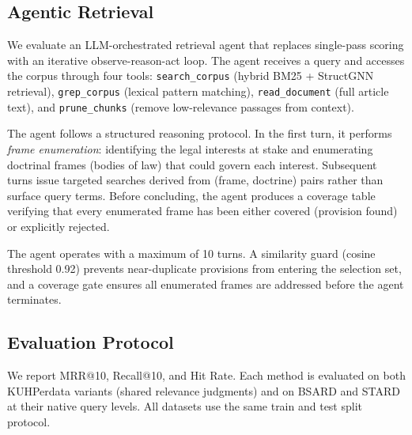 \subsection{Agentic Retrieval}
\label{sec:agentic}

We evaluate an LLM-orchestrated retrieval agent that replaces single-pass scoring with an iterative observe-reason-act loop. The agent receives a query and accesses the corpus through four tools: \texttt{search\_corpus} (hybrid BM25 + StructGNN retrieval), \texttt{grep\_corpus} (lexical pattern matching), \texttt{read\_document} (full article text), and \texttt{prune\_chunks} (remove low-relevance passages from context).

The agent follows a structured reasoning protocol. In the first turn, it performs \emph{frame enumeration}: identifying the legal interests at stake and enumerating doctrinal frames (bodies of law) that could govern each interest. Subsequent turns issue targeted searches derived from (frame, doctrine) pairs rather than surface query terms. Before concluding, the agent produces a coverage table verifying that every enumerated frame has been either covered (provision found) or explicitly rejected.

The agent operates with a maximum of 10 turns. A similarity guard (cosine threshold 0.92) prevents near-duplicate provisions from entering the selection set, and a coverage gate ensures all enumerated frames are addressed before the agent terminates.

\subsection{Evaluation Protocol}

We report MRR@10, Recall@10, and Hit Rate. Each method is evaluated on both KUHPerdata variants (shared relevance judgments) and on BSARD and STARD at their native query levels. All datasets use the same train and test split protocol.
